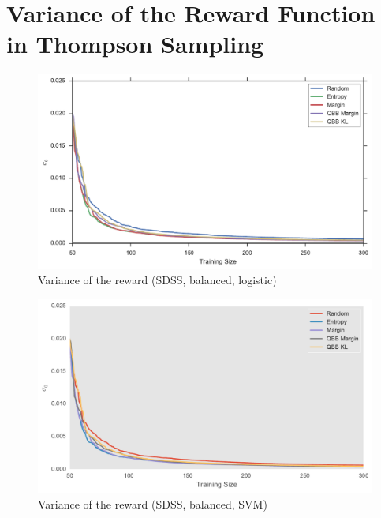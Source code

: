 \section{Variance of the Reward Function in Thompson Sampling}


\begin{figure}[p]
	\centering
	\includegraphics[width=\textwidth]{figures/5_thompson/sdss_bl_sigmas}
	\caption[Variance of the reward (SDSS, balanced, logistic)]{
		Variance of the reward (SDSS, balanced, logistic)}
	\label{fig:sdss_bl_sigmas}
\end{figure}

\begin{figure}[p]
	\centering
	\includegraphics[width=\textwidth]{figures/5_thompson/sdss_br_sigmas}
	\caption[Variance of the reward (SDSS, balanced, SVM)]{
		Variance of the reward (SDSS, balanced, SVM)}
	\label{fig:sdss_br_sigmas}
\end{figure}

